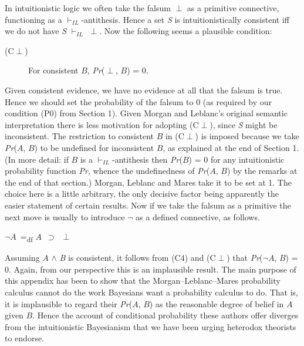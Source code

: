 \documentclass[
  11pt,
  letterpaper,
  DIV=11,
  numbers=noendperiod,
  oneside]{scrartcl}
\begin{document}
In intuitionistic logic we often take the falsum \({\perp}\) as a
primitive connective, functioning as a \(\vdash_{IL}\)-antithesis. Hence
a set \emph{S} is intuitionistically consistent iff we do not have
\emph{S} \(\vdash_{IL}\) \({\perp}\). Now the following seems a
plausible condition:

\begin{description}
\item[(C\({\perp}\))]
For consistent \(B\), \emph{Pr}(\({\perp}\), \(B\)) = 0.
\end{description}

Given consistent evidence, we have no evidence at all that the falsum is
true. Hence we should set the probability of the falsum to 0 (as
required by our condition (P0) from Section 1). Given Morgan and
Leblanc's original semantic interpretation there is less motivation for
adopting (C\({\perp}\)), since \emph{S} might be inconsistent. The
restriction to consistent \(B\) in (C\({\perp}\)) is imposed because we
take \emph{Pr}(\(A\), \(B\)) to be undefined for inconsistent \(B\), as
explained at the end of Section 1. (In more detail: if \(B\) is a
\(\vdash_{IL}\)-antithesis then \emph{Pr}(\(B\)) = 0 for any
intuitionistic probability function \emph{Pr}, whence the undefinedness
of \emph{Pr}(\(A\), \(B\)) by the remarks at the end of that section.)
Morgan, Leblanc and Mares take it to be set at 1. The choice here is a
little arbitrary, the only decisive factor being apparently the easier
statement of certain results. Now if we take the falsum as a primitive
the next move is usually to introduce \({\lnot}\) as a defined
connective, as follows.

\({\lnot}\)\(A\)~=\textsubscript{df} \(A\)~\({\supset}\)~\({\perp}\)

Assuming \(A\) \({\wedge}\) \emph{B} is consistent, it follows from (C4)
and (C\({\perp}\)) that \emph{Pr}(\({\lnot}\)\(A\), \(B\)) = 0. Again,
from our perspective this is an implausible result. The main purpose of
this appendix has been to show that the Morgan--Leblanc--Mares
probability calculus cannot do the work Bayesians want a probability
calculus to do. That is, it is implausible to regard their
\emph{Pr}(\(A\), \(B\)) as the reasonable degree of belief in \(A\)
given \(B\). Hence the account of conditional probability these authors
offer diverges from the intuitionistic Bayesianism that we have been
urging heterodox theorists to endorse.
\end{document}
